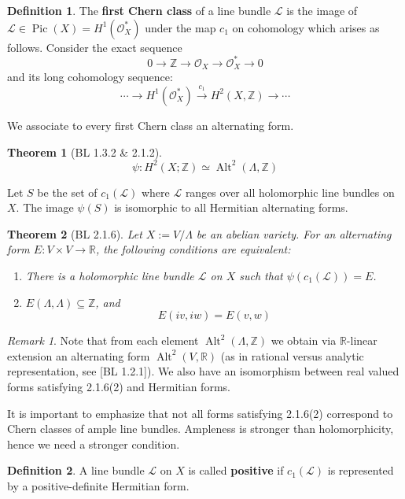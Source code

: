 \documentclass[12pt,reqno]{amsart}
\DeclareMathOperator{\Alt}{Alt}
\DeclareMathOperator{\Pic}{Pic}
\newcommand{\Z}{\mathbb{Z}}
\newcommand{\R}{\mathbb{R}}
\newcommand{\mc}{\mathcal}
\newtheorem*{thm*}{Theorem}
\theoremstyle{definition}
\newtheorem{defn}{Definition}
\theoremstyle{remark}
\newtheorem*{remark}{Remark}
\begin{document}
\begin{defn} The \textbf{first Chern class} of a line bundle $\mc{L}$ is the image of $\mc{L} \in \Pic(X) = H^1(\mc{O}_X^*)$ under the map $c_1$ on cohomology which arises as follows. Consider the exact sequence $$0 \to \Z \to \mc{O}_X \to \mc{O}_X^* \to 0$$ and its long cohomology sequence:
$$\cdots \to H^1(\mc{O}_X^*) \xrightarrow{c_1} H^2(X, \Z) \to \cdots$$ \end{defn} 

We associate to every first Chern class an alternating form.

\begin{thm*} [BL 1.3.2 \& 2.1.2] $$\psi: H^2(X; \Z) \simeq \Alt^2(\Lambda, \Z)$$ 
\end{thm*} 
 
Let $S$ be the set of $c_1(\mc{L})$ where $\mc{L}$ ranges over all holomorphic line bundles on $X$. The image $\psi(S)$ is isomorphic to all Hermitian alternating forms.

\begin{thm*} [BL 2.1.6] Let $X:= V/\Lambda$ be an abelian variety. For an alternating form $E: V \times V \to \R$, the following conditions are equivalent: 

\begin{enumerate} 
\item There is a holomorphic line bundle $\mc{L}$ on $X$ such that $\psi(c_1(\mc{L}))= E$. 
\item $E(\Lambda, \Lambda) \subseteq \Z$, and $$E(iv, iw) = E(v, w)$$
\end{enumerate}
\end{thm*} 

 
\begin{remark} Note that from each element $\Alt^2(\Lambda, \Z)$ we obtain via $\R$-linear extension an alternating form $\Alt^2(V, \R)$ (as in rational versus analytic representation, see [BL 1.2.1]). We also have an isomorphism between real valued forms satisfying 2.1.6(2) and Hermitian forms. \end{remark}

It is important to emphasize that not all forms satisfying 2.1.6(2) correspond to Chern classes of ample line bundles. Ampleness is stronger than holomorphicity, hence we need a stronger condition. 

\begin{defn} 
A line bundle $\mc{L}$ on $X$ is called \textbf{positive} if $c_1(\mc{L})$ is represented by a positive-definite Hermitian form.
\end{defn}
\end{document}
